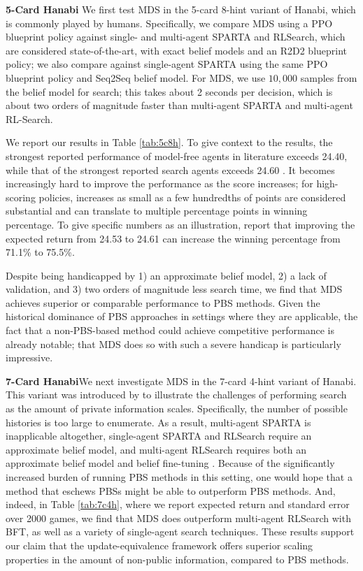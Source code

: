 \documentclass{article} %
\theoremstyle{plain}
\theoremstyle{definition}
\theoremstyle{remark}
\begin{document}
\textbf{5-Card Hanabi}\quad 
We first test MDS in the 5-card 8-hint variant of Hanabi, which is commonly played by humans.
Specifically, we compare MDS using a PPO blueprint policy against single- and multi-agent SPARTA and RLSearch, which are considered state-of-the-art, with exact belief models and an R2D2 blueprint policy; we also compare against single-agent SPARTA using the same PPO blueprint policy and Seq2Seq belief model.
For MDS, we use $10,000$ samples from the belief model for search; this takes about 2 seconds per decision, which is about two orders of magnitude faster than multi-agent SPARTA and multi-agent RL-Search.

We report our results in Table \ref{tab:5c8h}.
To give context to the results, the strongest reported performance of model-free agents in literature exceeds 24.40, while that of the strongest reported search agents exceeds 24.60 \citep{lbs}. 
It becomes increasingly hard to improve the performance as the score increases; for high-scoring policies, increases as small as a few hundredths of points are considered substantial and can translate to multiple percentage points in winning percentage.
To give specific numbers as an illustration, \citet{lerer2020improving} report that improving the expected return from 24.53 to 24.61 can increase the winning percentage from 71.1\% to 75.5\%.

Despite being handicapped by 1) an approximate belief model, 2) a lack of validation, and 3) two orders of magnitude less search time, we find that MDS achieves superior or comparable performance to PBS methods.
Given the historical dominance of PBS approaches in settings where they are applicable, the fact that a non-PBS-based method could achieve competitive performance is already notable; that MDS does so with such a severe handicap is particularly impressive.



\textbf{7-Card Hanabi}\quad We next investigate MDS in the 7-card 4-hint variant of Hanabi.
This variant was introduced by \citet{lbs} to illustrate the challenges of performing search as the amount of private information scales.
Specifically, the number of possible histories is too large to enumerate.
As a result, multi-agent SPARTA is inapplicable altogether, single-agent SPARTA and RLSearch require an approximate belief model, and multi-agent RLSearch requires both an approximate belief model and belief fine-tuning \citep{bft}.
Because of the significantly increased burden of running PBS methods in this setting, one would hope that a method that eschews PBSs might be able to outperform PBS methods.
And, indeed, in Table \ref{tab:7c4h}, where we report expected return and standard error over 2000 games, we find that MDS does outperform multi-agent RLSearch with BFT, as well as a variety of single-agent search techniques.
These results support our claim that the update-equivalence framework offers superior scaling properties in the amount of non-public information, compared to PBS methods.
\end{document}

